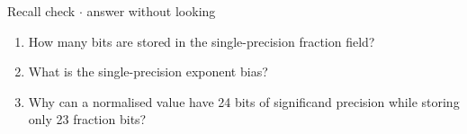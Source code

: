 \documentclass[11pt]{article}
\begin{document}
\begin{keepsection}
\begin{keepsection}
\begin{recallbox}{Recall check \ensuremath{\cdot} answer without looking}
\begin{enumerate}
\item How many bits are stored in the single-precision fraction field?
\item What is the single-precision exponent bias?
\item Why can a normalised value have 24 bits of significand precision while storing only 23 fraction bits?
\end{enumerate}

\end{recallbox}
\end{keepsection}
\end{keepsection}
\end{document}
